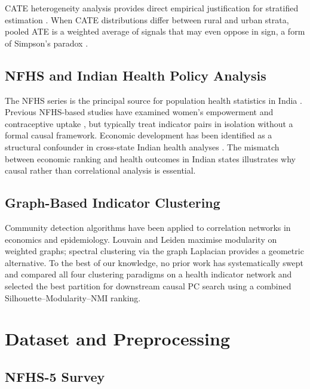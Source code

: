 \documentclass[12pt,a4paper]{report}
\begin{document}
CATE heterogeneity analysis provides direct empirical justification for stratified
estimation \citep{wager2018estimation,athey2016recursive}.
When CATE distributions differ between rural and urban strata, pooled ATE is a
weighted average of signals that may even oppose in sign, a form of Simpson's
paradox \citep{pearl2009causality}.

\section{NFHS and Indian Health Policy Analysis}

The NFHS series is the principal source for population health statistics in India
\citep{nfhs5report}.
Previous NFHS-based studies have examined women's empowerment \citep{vignitha2024women}
and contraceptive uptake \citep{sedgh2016unmet}, but typically treat indicator pairs
in isolation without a formal causal framework.
Economic development has been identified as a structural confounder in cross-state
Indian health analyses \citep{thorn1968per,hordofa2023moderating}.
The mismatch between economic ranking and health outcomes in Indian states
\citep{viswanathan2021growth} illustrates why causal rather than correlational
analysis is essential.

\section{Graph-Based Indicator Clustering}

Community detection algorithms have been applied to correlation networks in
economics and epidemiology.
Louvain \citep{blondel2008fast} and Leiden \citep{traag2019louvain} maximise
modularity on weighted graphs; spectral clustering via the graph Laplacian
\citep{ng2002spectral} provides a geometric alternative.
To the best of our knowledge, no prior work has systematically swept and compared
all four clustering paradigms on a health indicator network and selected the best
partition for downstream causal PC search using a combined Silhouette--Modularity--NMI
ranking.

\chapter{Dataset and Preprocessing}
\label{chap:data}

\section{NFHS-5 Survey}
\end{document}
